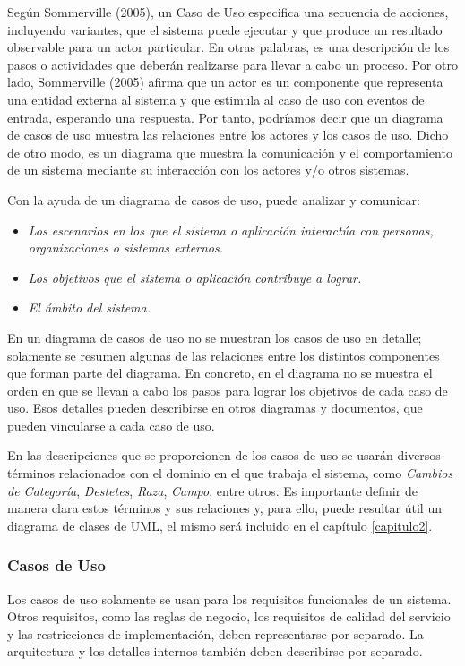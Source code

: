 \documentclass[11pt,oneside]{book}
\begin{document}
Según Sommerville (2005), un Caso de Uso especifica una secuencia de acciones, incluyendo variantes, que el sistema puede ejecutar y que produce un resultado observable para un actor particular. En otras palabras, es una descripción de los pasos o actividades que deberán realizarse para llevar a cabo un proceso. Por otro lado, Sommerville (2005) afirma que un actor es un componente que representa una entidad externa al sistema y que estimula al caso de uso con eventos de entrada, esperando una respuesta. Por tanto, podríamos decir que un diagrama de casos de uso muestra las relaciones entre los actores y los casos de uso. Dicho de otro modo, es un diagrama que muestra la comunicación y el comportamiento de un sistema mediante su interacción con los actores y/o otros sistemas.

\newpage
Con la ayuda de un diagrama de casos de uso, puede analizar y comunicar:
\begin{itemize}
\item \textit{Los escenarios en los que el sistema o aplicación interactúa con personas, organizaciones o sistemas externos.}
\item \textit{Los objetivos que el sistema o aplicación contribuye a lograr.}
\item \textit{El ámbito del sistema.}
\end{itemize}
    
En un diagrama de casos de uso no se muestran los casos de uso en detalle; solamente se resumen algunas de las relaciones entre los distintos componentes que forman parte del diagrama. En concreto, en el diagrama no se muestra el orden en que se llevan a cabo los pasos para lograr los objetivos de cada caso de uso. Esos detalles pueden describirse en otros diagramas y documentos, que pueden vincularse a cada caso de uso.

En las descripciones que se proporcionen de los casos de uso se usarán diversos términos relacionados con el dominio en el que trabaja el sistema, como \textit{Cambios de Categoría}, \textit{Destetes}, \textit{Raza}, \textit{Campo}, entre otros. Es importante definir de manera clara estos términos y sus relaciones y, para ello, puede resultar útil un diagrama de clases de UML, el mismo será incluido en el capítulo \eqref{capitulo2}.

\subsubsection{Casos de Uso}
Los casos de uso solamente se usan para los requisitos funcionales de un sistema. Otros requisitos, como las reglas de negocio, los requisitos de calidad del servicio y las restricciones de implementación, deben representarse por separado. La arquitectura y los detalles internos también deben describirse por separado.
\end{document}
